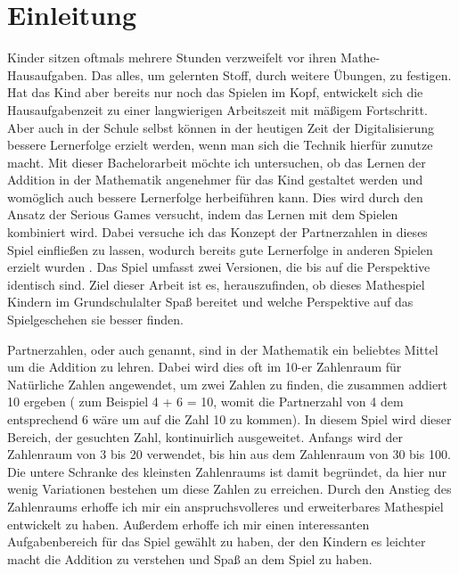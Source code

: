 
\chapter{Einleitung}
Kinder sitzen oftmals mehrere Stunden verzweifelt vor ihren Mathe-Hausaufgaben. Das alles, um gelernten Stoff, durch weitere Übungen, zu festigen. Hat das Kind aber bereits nur noch das Spielen im Kopf, entwickelt sich die Hausaufgabenzeit zu einer langwierigen Arbeitszeit mit mäßigem Fortschritt. Aber auch in der Schule selbst können in der heutigen Zeit der Digitalisierung bessere Lernerfolge erzielt werden, wenn man sich die Technik hierfür zunutze macht. Mit dieser Bachelorarbeit möchte ich untersuchen, ob das Lernen der Addition in der Mathematik angenehmer für das Kind gestaltet werden und womöglich auch bessere Lernerfolge herbeiführen kann. Dies wird durch den Ansatz der Serious Games versucht, indem das Lernen mit dem Spielen kombiniert wird. Dabei versuche ich das Konzept der Partnerzahlen in dieses Spiel einfließen zu lassen, wodurch bereits gute Lernerfolge in anderen Spielen erzielt wurden \cite{Jung2016}. Das Spiel umfasst zwei Versionen, die bis auf die Perspektive identisch sind. Ziel dieser Arbeit ist es, herauszufinden, ob dieses Mathespiel Kindern im Grundschulalter Spaß bereitet und welche Perspektive auf das Spielgeschehen sie besser finden.

Partnerzahlen, oder auch  genannt, sind in der Mathematik ein beliebtes Mittel um die Addition zu lehren. Dabei wird dies oft im 10-er Zahlenraum für Natürliche Zahlen angewendet, um zwei Zahlen zu finden, die zusammen addiert 10 ergeben ( zum Beispiel 4 + 6 = 10, womit die Partnerzahl von 4 dem entsprechend 6 wäre um auf die Zahl 10 zu kommen). In diesem Spiel wird dieser Bereich, der gesuchten Zahl, kontinuirlich ausgeweitet. Anfangs wird der Zahlenraum von 3 bis 20 verwendet, bis hin aus dem Zahlenraum von 30 bis 100. Die untere Schranke des kleinsten Zahlenraums ist damit begründet, da hier nur wenig Variationen bestehen um diese Zahlen zu erreichen. Durch den Anstieg des Zahlenraums erhoffe ich mir ein anspruchsvolleres und erweiterbares Mathespiel entwickelt zu haben. Außerdem erhoffe ich mir einen interessanten Aufgabenbereich für das Spiel gewählt zu haben, der den Kindern es leichter macht die Addition zu verstehen und Spaß an dem Spiel zu haben.

